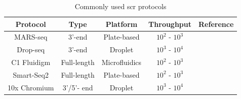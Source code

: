 \begin{table}[t]
\renewcommand{\arraystretch}{1.2} %
\centering
  \caption[Commonly used \gls{scr} protocols]{Commonly used \gls{scr} protocols}
  \label{tab:chp1_scprotocols}
  \begin{tabularx}{\textwidth}{C C C C C}
    \hline
    \textbf{Protocol} & \textbf{Type} & \textbf{Platform} & \textbf{Throughput} & \textbf{Reference} \\
    \hline
    MARS-seq & 3'-end & Plate-based & $10^2$ - $10^3$ & \textbf{\cite{jaitin_massively_2014}} \\
    \hline
    Drop-seq & 3'-end & Droplet & $10^3$ - $10^4$ & \textbf{\cite{macosko_highly_2015}} \\
    \hline
    C1 Fluidigm & Full-length & Microfluidics & $10^2$ - $10^3$ & \textbf{\cite{pollen_low-coverage_2014}} \\
    \hline
    Smart-Seq2 & Full-length & Plate-based & $10^2$ - $10^3$ & \textbf{\cite{picelli_smart-seq2_2013}} \\
    \hline
    10x Chromium & 3'/5'- end & Droplet & $10^3$ - $10^4$ & \textbf{\cite{zheng_massively_2017}} \\
    \hline
    
    
  \end{tabularx}

\end{table}



